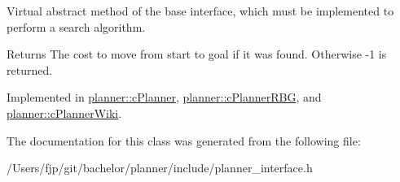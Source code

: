 Virtual abstract method of the base interface, which must be implemented to perform a search algorithm. 

\begin{DoxyReturn}{Returns}
The cost to move from start to goal if it was found. Otherwise -\/1 is returned. 
\end{DoxyReturn}


Implemented in \mbox{\hyperlink{classplanner_1_1c_planner_a21230c015260b9fc34ad2f239592470e}{planner\+::c\+Planner}}, \mbox{\hyperlink{classplanner_1_1c_planner_r_b_g_a0bbd752702da582a47dbd153c0065eb5}{planner\+::c\+Planner\+R\+BG}}, and \mbox{\hyperlink{classplanner_1_1c_planner_wiki_a9d18be721400b51162ff463ab11d1721}{planner\+::c\+Planner\+Wiki}}.



The documentation for this class was generated from the following file\+:\begin{DoxyCompactItemize}
\item 
/\+Users/fjp/git/bachelor/planner/include/planner\+\_\+interface.\+h\end{DoxyCompactItemize}

